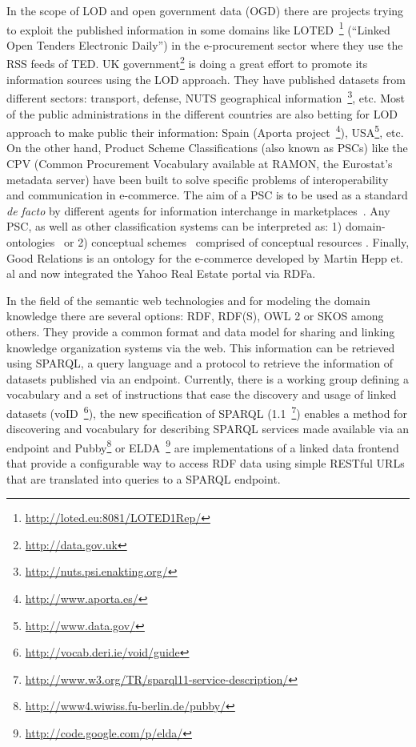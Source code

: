 \documentclass{llncs}
\begin{document}
In the scope of LOD and open government data (OGD) there are projects
trying to exploit the published information in some domains like 
LOTED~\footnote{\url{http://loted.eu:8081/LOTED1Rep/}} (``Linked Open Tenders
Electronic Daily'') in the e-procurement sector  where they use the RSS feeds of TED. 
UK government\footnote{\url{http://data.gov.uk}} is doing a great effort to
promote its information sources using the LOD approach. They have published datasets
from different sectors: transport, defense, NUTS geographical
information~\footnote{\url{http://nuts.psi.enakting.org/}}, etc. Most of the
public administrations in the different countries are also betting for LOD
approach to make public their information: Spain (Aporta
project~\footnote{\url{http://www.aporta.es/}}),
USA\footnote{\url{http://www.data.gov/}}, etc. On the other hand, Product Scheme Classifications (also known as PSCs) 
like the CPV (Common Procurement Vocabulary available at RAMON, the Eurostat's metadata server) have been built to solve
specific problems of interoperability and communication in e-commerce\cite{Volker02amodeling,Corcho01solvingintegration}. 
The aim of a PSC is to be used as a standard \textit{de facto} by different agents for information interchange 
in marketplaces~\cite{DBLP:journals/tcci/Alor-HernandezAJPRMBG10}. Any PSC, as well as other classification systems can 
be interpreted as: 1) domain-ontologies~\cite{Hepp-possible} or 2) conceptual schemes~\cite{chemaEurovoc2008} comprised 
of conceptual resources . Finally, Good Relations is an ontology for the e-commerce developed by 
Martin Hepp et. al and now integrated the Yahoo Real Estate portal via RDFa.

In the field of the semantic web technologies and for modeling the domain knowledge 
there are several options: RDF, RDF(S), OWL 2 or SKOS among others. 
They provide a common format and data model for sharing and linking knowledge organization systems 
via the web. This information can be retrieved using SPARQL, 
a query language and a protocol to retrieve the information of datasets published via an endpoint. 
Currently, there is a working group defining a vocabulary and a set of instructions 
that ease the discovery and usage of linked datasets (voID~\footnote{\url{http://vocab.deri.ie/void/guide}}), 
the new specification of SPARQL (1.1~\footnote{\url{http://www.w3.org/TR/sparql11-service-description/}}) 
enables a method for discovering and vocabulary for describing SPARQL services 
made available via an endpoint and Pubby\footnote{\url{http://www4.wiwiss.fu-berlin.de/pubby/}} or 
ELDA~\footnote{\url{http://code.google.com/p/elda/}} are implementations of a linked data frontend that provide a 
configurable way to access RDF data using simple RESTful URLs that are translated into 
queries to a SPARQL endpoint. 
\end{document}
